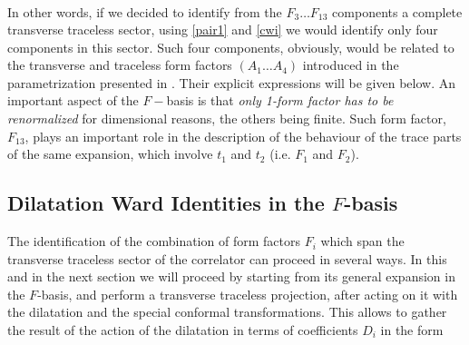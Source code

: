 \documentclass[a4paper,11pt,openright,twoside]{book}
\numberwithin{equation}{section}
\begin{document}
{{\begin{equation}
\begin{split}
	\end{split}
\end{equation}
In other words, if we decided to identify from the $F_3\ldots F_{13}$ components a complete transverse traceless sector, using \eqref{pair1} and \eqref{cwi} we would identify only four components in this sector. Such four components, obviously, would be related to the transverse and traceless form factors $(A_1\ldots A_4)$ introduced in the parametrization presented in \cite{Bzowski:2013sza}. Their explicit expressions will be given below. An important aspect of the $F-$basis is that {\em only 1-form factor has to be renormalized} for dimensional reasons, the others being finite. Such form factor, $F_{13}$, plays an important role in the description of the behaviour of the trace parts 
of the same expansion, which involve $t_1$ and $t_2$ (i.e. $F_1$ and $F_2$).

\subsection{Dilatation Ward Identities in the \texorpdfstring{$F$}{}-basis}
The identification of the combination of form factors $F_i$ which span the transverse traceless sector of the correlator can proceed in several ways. In this and in the next section we will proceed by starting from its general expansion in the $F$-basis, and perform a transverse traceless projection, after acting on it with the dilatation and the special conformal transformations. 
This allows to gather the result of the action of the dilatation in terms of coefficients $D_i$ in the form 

}}
\end{document}
